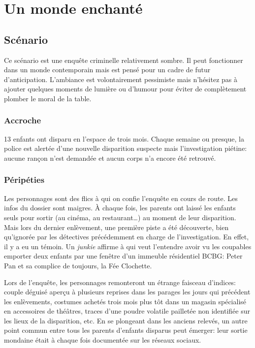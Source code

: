 \chapter{Un monde enchanté}

\section{Scénario}

Ce scénario est une enquête criminelle relativement sombre.
Il peut fonctionner dans un monde contemporain mais est pensé pour un cadre de futur d'anticipation.
L'ambiance est volontairement pessimiste mais n'hésitez pas à ajouter quelques moments de lumière ou d'humour pour éviter de complètement plomber le moral de la table.

\subsection{Accroche}

13 enfants ont disparu en l'espace de trois mois.
Chaque semaine ou presque, la police est alertée d'une nouvelle disparition suspecte mais l'investigation piétine: aucune rançon n'est demandée et aucun corps n'a encore été retrouvé.

\subsection{Péripéties}

Les personnages sont des flics à qui on confie l'enquête en cours de route.
Les infos du dossier sont maigres.
À chaque fois, les parents ont laissé les enfants seuls pour sortir (au cinéma, au restaurant\dots) au moment de leur disparition.
Mais lors du dernier enlèvement, une première piste a été découverte, bien qu'ignorée par les détectives précédemment en charge de l'investigation.
En effet, il y a eu un témoin.
Un \emph{junkie} affirme à qui veut l'entendre avoir vu les coupables emporter deux enfants par une fenêtre d'un immeuble résidentiel BCBG: Peter Pan et sa complice de toujours, la Fée Clochette.

Lors de l'enquête, les personnages remonteront un étrange faisceau d'indices: couple déguisé aperçu à plusieurs reprises dans les parages les jours qui précédent les enlèvements, costumes achetés trois mois plus tôt dans un magasin spécialisé en accessoires de théâtres, traces d'une poudre volatile pailletée non identifiée sur les lieux de la disparition, etc.
En se plongeant dans les anciens relevés, un autre point commun entre tous les parents d'enfants disparus peut émerger: leur sortie mondaine était à chaque fois documentée sur les réseaux sociaux.

